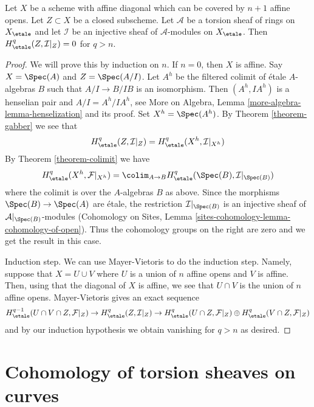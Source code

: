 \begin{lemma}
\label{lemma-vanishing-restriction-injective}
Let $X$ be a scheme with affine diagonal which can be covered by
$n + 1$ affine opens. Let $Z \subset X$ be a closed subscheme.
Let $\mathcal{A}$ be a torsion sheaf of rings on $X_\etale$
and let $\mathcal{I}$ be an injective sheaf of $\mathcal{A}$-modules
on $X_\etale$.
Then $H^q_\etale(Z, \mathcal{I}|_Z) = 0$ for $q > n$.
\end{lemma}

\begin{proof}
We will prove this by induction on $n$. If $n = 0$, then $X$ is affine.
Say $X = \Spec(A)$ and $Z = \Spec(A/I)$. Let $A^h$ be the filtered colimit
of \'etale $A$-algebras $B$ such that $A/I \to B/IB$ is an isomorphism.
Then $(A^h, IA^h)$ is a henselian pair and $A/I = A^h/IA^h$, see
More on Algebra, Lemma \ref{more-algebra-lemma-henselization}
and its proof. Set $X^h = \Spec(A^h)$.
By Theorem \ref{theorem-gabber}
we see that
$$
H^q_\etale(Z, \mathcal{I}|_Z) = H^q_\etale(X^h, \mathcal{I}|_{X^h})
$$
By Theorem \ref{theorem-colimit} we have
$$
H^q_\etale(X^h, \mathcal{F}|_{X^h}) =
\colim_{A \to B} H^q_\etale(\Spec(B), \mathcal{I}|_{\Spec(B)})
$$
where the colimit is over the $A$-algebras $B$ as above.
Since the morphisms $\Spec(B) \to \Spec(A)$ are \'etale,
the restriction $\mathcal{I}|_{\Spec(B)}$ is an injective
sheaf of $\mathcal{A}|_{\Spec(B)}$-modules
(Cohomology on Sites, Lemma \ref{sites-cohomology-lemma-cohomology-of-open}).
Thus the cohomology groups on the right are zero and we get the
result in this case.

\medskip\noindent
Induction step. We can use Mayer-Vietoris to do the induction step.
Namely, suppose that $X = U \cup V$ where $U$ is a union of $n$ affine
opens and $V$ is affine. Then, using that the diagonal of $X$ is affine,
we see that $U \cap V$ is the union of $n$ affine opens. Mayer-Vietoris
gives an exact sequence
$$
H^{q - 1}_\etale(U \cap V \cap Z, \mathcal{F}|_Z) \to
H^q_\etale(Z, \mathcal{I}|_Z) \to
H^q_\etale(U \cap Z, \mathcal{F}|_Z) \oplus
H^q_\etale(V \cap Z, \mathcal{F}|_Z)
$$
and by our induction hypothesis we obtain vanishing for $q > n$ as desired.
\end{proof}





\section{Cohomology of torsion sheaves on curves}
\label{section-vanishing-torsion}


